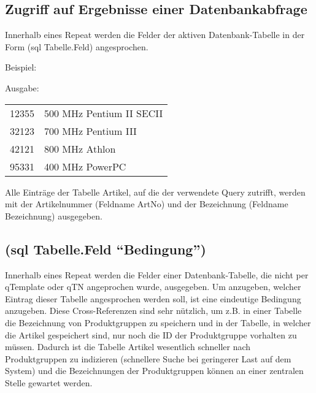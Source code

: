 \subsection{Zugriff auf Ergebnisse einer Datenbankabfrage}

Innerhalb eines Repeat werden die Felder der aktiven Datenbank-Tabelle
in der Form (sql Tabelle.Feld) angesprochen.

\medskip

Beispiel:

\wancicodeblock{(repeat ``Artikel.ID{]}0'')\\
\\
(sql Artikel.ArtNo) (sql Artikel.Bezeichnung)<br>\\
\\
(endrepeat)}

\medskip

Ausgabe:

\bigskip

\begin{tabular*}{128mm}{p{30mm} p{90mm}}
12355 & 500 MHz Pentium II SECII\\
32123 & 700 MHz Pentium III\\
42121 & 800 MHz Athlon\\
95331 & 400 MHz PowerPC\\
\end{tabular*}

\bigskip

Alle Eintr\"age der Tabelle Artikel, auf die der verwendete Query
zutrifft, werden mit der Artikelnummer (Feldname ArtNo) und der
Bezeichnung (Feldname Bezeichnung) ausgegeben.

\subsection{(sql Tabelle.Feld ``Bedingung'')}
\label{sqltf}

Innerhalb eines Repeat werden die Felder einer Datenbank-Tabelle, die
nicht per qTemplate oder qTN angeprochen wurde, ausgegeben. Um
anzugeben, welcher Eintrag dieser Tabelle angesprochen werden soll,
ist eine eindeutige Bedingung anzugeben. Diese Cross-Referenzen sind
sehr n\"utzlich, um z.B. in einer Tabelle die Bezeichnung von
Produktgruppen zu speichern und in der Tabelle, in welcher die Artikel
gespeichert sind, nur noch die ID der Produktgruppe vorhalten zu
m\"ussen. Dadurch ist die Tabelle Artikel wesentlich schneller nach
Produktgruppen zu indizieren (schnellere Suche bei geringerer Last auf
dem System) und die Bezeichnungen der Produktgruppen k\"onnen an einer
zentralen Stelle gewartet werden.

